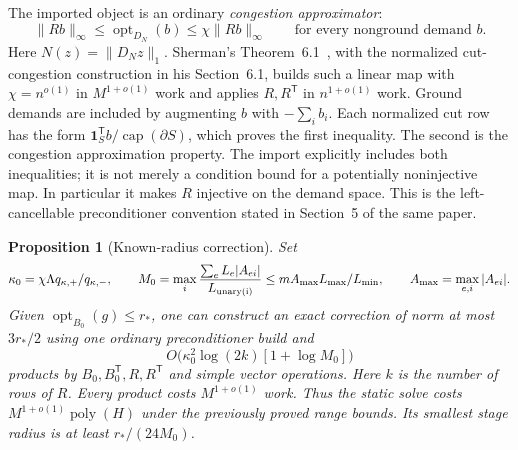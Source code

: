 \documentclass[11pt]{article}
\newtheorem{proposition}[theorem]{Proposition}
\theoremstyle{definition}\newtheorem{definition}[theorem]{Definition}
\theoremstyle{remark}\newtheorem{remark}[theorem]{Remark}
\begin{document}
The imported object is an ordinary \emph{congestion approximator}:
\begin{equation}\label{eq:recovery-preconditioner-import}
 \|Rb\|_\infty\le\operatorname{opt}_{D_N}(b)
                 \le\chi\|Rb\|_\infty
 \qquad\text{for every nonground demand }b.
\end{equation}
Here $N(z)=\|D_Nz\|_1$. Sherman's Theorem~6.1~\cite{sherman}, with
the normalized cut-congestion construction in his Section~6.1, builds
such a linear map with $\chi=n^{o(1)}$ in $M^{1+o(1)}$ work and applies
$R,R^{\mathsf T}$ in $n^{1+o(1)}$ work. Ground demands are included by
augmenting $b$ with $-\sum_i b_i$. Each normalized cut row has the form
$\mathbf1_S^{\mathsf T}b/\operatorname{cap}(\partial S)$, which proves
the first inequality. The second is the congestion approximation
property. The import explicitly includes both inequalities; it is not
merely a condition bound for a potentially noninjective map. In
particular it makes $R$ injective on the demand space. This is the
left-cancellable preconditioner convention stated in Section~5 of the
same paper.

\begin{proposition}[Known-radius correction]
\label{thm:recovery-constructive}
Set
\[
 \kappa_0=\chi\Lambda q_{\kappa,+}/q_{\kappa,-},\qquad
 M_0=\max_i\frac{\sum_eL_e|A_{ei}|}{L_{\rm unary(i)}}
       \le mA_{\max}L_{\max}/L_{\min},\qquad A_{\max}=\max_{e,i}|A_{ei}|.
\]
Given
$\operatorname{opt}_{B_0}(g)\le r_*$, one can construct an exact
correction of norm at most $3r_*/2$ using one ordinary preconditioner
build and
\begin{equation}\label{eq:recovery-static-iterations}
 O\bigl(\kappa_0^2\log(2k)[1+\log M_0]\bigr)
\end{equation}
products by $B_0,B_0^{\mathsf T},R,R^{\mathsf T}$ and simple vector
operations. Here $k$ is the number of rows of $R$.
Every product costs $M^{1+o(1)}$ work. Thus the static solve costs
$M^{1+o(1)}\operatorname{poly}(H)$ under the previously proved range
bounds. Its smallest stage radius is at least $r_*/(24M_0)$.
\end{proposition}
\end{document}
